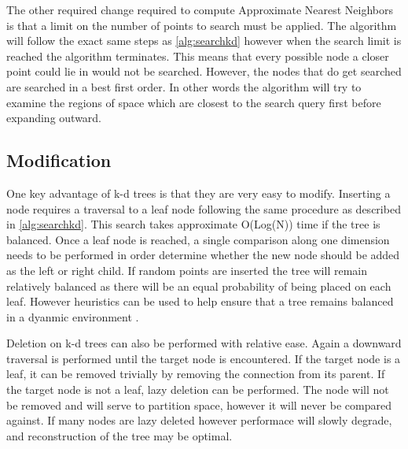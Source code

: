 The other required change required to compute Approximate Nearest Neighbors is that a limit on the number of points to search must be applied.  The algorithm will follow the exact same steps as \ref{alg:searchkd} however when the search limit is reached the algorithm terminates.  This means that every possible node a closer point could lie in would not be searched.  However, the nodes that do get searched are searched in a best first order.  In other words the algorithm will try to examine the regions of space which are closest to the search query first before expanding outward.

\subsection{Modification}

One key advantage of k-d trees is that they are very easy to modify.  Inserting a node requires a traversal to a leaf node following the same procedure as described in \ref{alg:searchkd}.  This search takes approximate O(Log(N)) time if the tree is balanced.  Once a leaf node is reached, a single comparison along one dimension needs to be performed in order determine whether the new node should be added as the left or right child.  If random points are inserted the tree will remain relatively balanced as there will be an equal probability of being placed on each leaf.  However heuristics can be used to help ensure that a tree remains balanced in a dyanmic environment \citep{hunt2006fast}.

Deletion on k-d trees can also be performed with relative ease.  Again a downward traversal is performed until the target node is encountered. If the target node is a leaf, it can be removed trivially by removing the connection from its parent.  If the target node is not a leaf, lazy deletion can be performed.  The node will not be removed and will serve to partition space, however it will never be compared against.  If many nodes are lazy deleted however performace will slowly degrade, and reconstruction of the tree may be optimal.